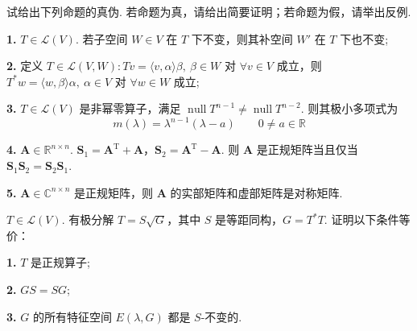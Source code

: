 \documentclass[UTF8,14pt,normal]{ctexart}
\begin{document}
 试给出下列命题的真伪. 若命题为真，请给出简要证明；若命题为假，请举出反例.

\textbf{1.} $ T \in \mathcal{L}(V) $. 若子空间 $ W \in V $ 在 $ T $ 下不变，则其补空间 $ W' $ 在 $ T $ 下也不变;

\textbf{2.} 定义 $ T \in \mathcal{L}(V, W) : Tv = \langle v, \alpha \rangle \beta,\ \beta \in W $ 对 $ \forall v \in V $ 成立，则 $ T^* w = \langle w, \beta \rangle \alpha,\ \alpha \in V $ 对 $ \forall w \in W $ 成立;

\textbf{3.} $ T \in \mathcal{L}(V) $ 是非幂零算子，满足 $ \operatorname{null} T^{n - 1} \neq \operatorname{null} T^{n - 2} $. 则其极小多项式为
\[ m(\lambda) = \lambda^{n-1}(\lambda - a) \qquad 0 \neq a \in \mathbb{R} \]

\textbf{4.} $ \mathbf{A} \in \mathbb{R}^{n \times n} $. $ \mathbf{S}_1 = \mathbf{A}^{\mathrm{T}} + \mathbf{A} $，$ \mathbf{S}_2 = \mathbf{A}^{\mathrm{T}} - \mathbf{A} $. 则 $ \mathbf{A} $ 是正规矩阵当且仅当 $ \mathbf{S}_1 \mathbf{S}_2 = \mathbf{S}_2 \mathbf{S}_1 $.

\textbf{5.} $ \mathbf{A} \in \mathbb{C}^{n \times n} $ 是正规矩阵，则 $ \mathbf{A} $ 的实部矩阵和虚部矩阵是对称矩阵.

 $ T \in \mathcal{L}(V) $. 有极分解 $ T = S \sqrt{G} $，其中 $ S $ 是等距同构，$ G = T^* T $. 证明以下条件等价：

\textbf{1.} $ T $ 是正规算子;

\textbf{2.} $ GS = SG $;

\textbf{3.} $ G $ 的所有特征空间 $ E(\lambda, G) $ 都是 $ S $-不变的.
\end{document}
